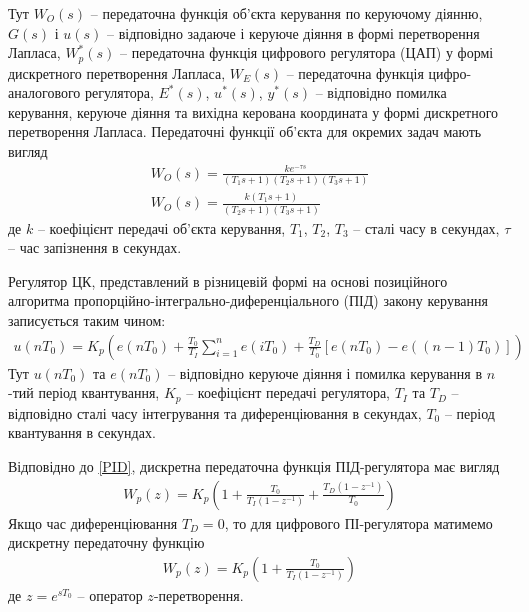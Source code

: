 Тут $W_O(s)$ -- передаточна функція об'єкта керування по керуючому діянню, $G(s)$ і $u(s)$ -- відповідно задаюче і керуюче діяння в формі
перетворення Лапласа, $W_p^*(s)$ -- передаточна функція цифрового регулятора (ЦАП) у формі дискретного перетворення Лапласа,
$W_E(s)$ -- передаточна функція цифро-аналогового регулятора, $E^*(s)$, $u^*(s)$, $y^*(s)$ -- відповідно помилка керування,
керуюче діяння та вихідна керована координата у формі дискретного перетворення Лапласа. Передаточні функції об'єкта для окремих задач мають вигляд
\begin{gather}\label{W_0}
    W_O(s) = \frac{
        k e^{-\tau s}
    }{
        (T_1 s + 1) (T_2 s + 1) (T_3 s + 1)
    } \\
    \label{W_0_12}
    W_O(s) = \frac{
        k (T_1 s + 1)
    }{
        (T_2 s + 1) (T_3 s + 1)
    }
\end{gather}
де $k$ -- коефіцієнт передачі об'єкта керування, $T_1$, $T_2$, $T_3$ -- сталі часу в секундах, $\tau$ -- час запізнення в секундах.

Регулятор ЦК, представлений в різницевій формі на основі позиційного алгоритма пропорційно-інтегрально-диференціального (ПІД)
закону керування записується таким чином:
\begin{gather}\label{PID}
    u(n T_0) = K_p \left(
        e(n T_0) + \frac{T_0}{T_I} \sum_{i=1}^n e(i T_0) +
        \frac{T_D}{T_0} \left[e(n T_0) - e((n-1)T_0)\right]
    \right)
\end{gather}
Тут $u(n T_0)$ та $e(n T_0)$ -- відповідно керуюче діяння і помилка керування в $n$-тий період квантування,
$K_p$ -- коефіцієнт передачі регулятора, $T_I$ та $T_D$ -- відповідно сталі часу інтегрування та диференціювання в секундах,
$T_0$ -- період квантування в секундах. 

Відповідно до \eqref{PID}, дискретна передаточна функція ПІД-регулятора має вигляд
\begin{gather}
    W_p(z) = K_p \left(
        1 + \frac{T_0}{T_I \left(1 - z^{-1}\right)} + \frac{T_D\left(1 - z^{-1}\right)}{T_0}
    \right)
\end{gather}
Якщо час диференціювання $T_D = 0$, то для цифрового ПІ-регулятора матимемо дискретну передаточну функцію
\begin{gather}\label{PI}
    W_p(z) = K_p \left(
        1 + \frac{T_0}{T_I \left(1 - z^{-1}\right)}
    \right)
\end{gather}
де $z = e^{sT_0}$ -- оператор $z$-перетворення.

